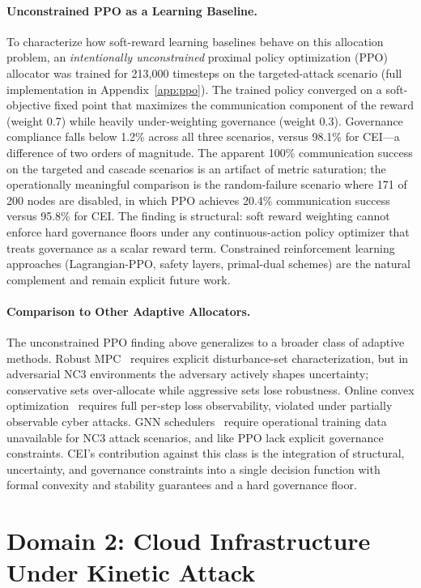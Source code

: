 \documentclass[runningheads]{llncs}
\begin{document}
\paragraph{Unconstrained PPO as a Learning Baseline.} To characterize how soft-reward learning baselines behave on this allocation problem, an \emph{intentionally unconstrained} proximal policy optimization (PPO) allocator was trained for 213{,}000 timesteps on the targeted-attack scenario (full implementation in Appendix~\ref{app:ppo}). The trained policy converged on a soft-objective fixed point that maximizes the communication component of the reward (weight 0.7) while heavily under-weighting governance (weight 0.3). Governance compliance falls below 1.2\% across all three scenarios, versus 98.1\% for CEI---a difference of two orders of magnitude. The apparent 100\% communication success on the targeted and cascade scenarios is an artifact of metric saturation; the operationally meaningful comparison is the random-failure scenario where 171 of 200 nodes are disabled, in which PPO achieves 20.4\% communication success versus 95.8\% for CEI. The finding is structural: soft reward weighting cannot enforce hard governance floors under any continuous-action policy optimizer that treats governance as a scalar reward term. Constrained reinforcement learning approaches (Lagrangian-PPO, safety layers, primal-dual schemes) are the natural complement and remain explicit future work.

\paragraph{Comparison to Other Adaptive Allocators.} The unconstrained PPO finding above generalizes to a broader class of adaptive methods. Robust MPC~\cite{mayne} requires explicit disturbance-set characterization, but in adversarial NC3 environments the adversary actively shapes uncertainty; conservative sets over-allocate while aggressive sets lose robustness. Online convex optimization~\cite{hazan} requires full per-step loss observability, violated under partially observable cyber attacks. GNN schedulers~\cite{deng} require operational training data unavailable for NC3 attack scenarios, and like PPO lack explicit governance constraints. CEI's contribution against this class is the integration of structural, uncertainty, and governance constraints into a single decision function with formal convexity and stability guarantees and a hard governance floor.

\section{Domain 2: Cloud Infrastructure Under Kinetic Attack}
\label{sec:cloud}
\end{document}
